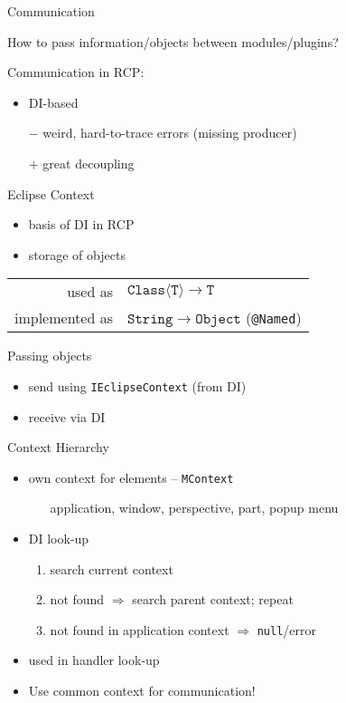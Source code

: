 \documentclass{beamer}
\makeatletter
\newcommand{\@eg}{\raisebox{-0.5mm}{\HandRight}}
\def\eg{\@ifstar{\textcolor{ice}{\@eg}}{\textcolor{pumpkin}{\@eg}}}
\newcommand{\fig}{\textcolor{pumpkin}{\raisebox{-0.5mm}{\PencilRightDown}}}
\newcommand{\str}[1]{\structure{#1}}
\newenvironment{centerblock}{\begin{block}{}\begin{center}}{\end{center}\end{block}}
\newcommand{\ttt}[1]{\texttt{\color{honey}#1}}
\newcommand{\mtt}[1]{\ensuremath{\mathtt{#1}}}
\newcommand{\singleindent}[1]{\begin{itemize}\item[] #1\end{itemize}}
\makeatother
\begin{document}
\begin{frame}{Communication}%
	\begin{centerblock}How to pass information/objects between modules/plugins?\end{centerblock}

	\medskip

	Communication in RCP:
	\begin{itemize}
		\item DI-based
		\item[$-$] weird, hard-to-trace errors (missing producer)
		\item[$+$] great decoupling
	\end{itemize}
\end{frame}%
\begin{frame}{Eclipse Context}%
	\begin{itemize}
		\item basis of DI in RCP
		\item storage of objects
	\end{itemize}
	\begin{centerblock}\begin{tabular}{rl}
		used as & $\mtt{Class\langle T\rangle}\to\mtt{T}$\\
		implemented as & $\mtt{String} \to \mtt{Object}$ (\ttt{@Named})\\
	\end{tabular}\end{centerblock}
	Passing objects \eg
	\begin{itemize}
		\item send using \ttt{IEclipseContext} (from DI)
		\item receive via DI
	\end{itemize}
\end{frame}%
\begin{frame}{Context Hierarchy}%
	\begin{itemize}
		\item own context for \str{app model} elements -- \ttt{MContext}\\
			\singleindent{application, window, perspective, part, popup menu}

		\item DI look-up \fig
			\begin{enumerate}
				\item search current context
				\item not found $\Rightarrow$ search parent context; \alert{repeat}
				\item not found in application context $\Rightarrow$ \texttt{null}/error
			\end{enumerate}

		\item used in handler look-up
		\item \alert{Use common context for communication!} \eg
	\end{itemize}
\end{frame}%
\end{document}
